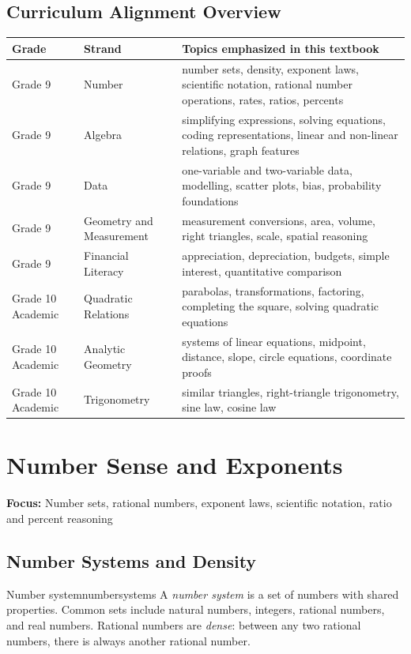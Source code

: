 \documentclass[11pt,oneside]{book}
\newcommand{\topicline}[1]{\medskip\noindent\textbf{Focus:} #1\par\medskip}
\begin{document}
\section{Curriculum Alignment Overview}
\begin{longtable}{>{\raggedright\arraybackslash}p{} >{\raggedright\arraybackslash}p{} >{\raggedright\arraybackslash}p{}}
\toprule
Grade & Strand & Topics emphasized in this textbook \\
\midrule
\endhead
Grade 9 & Number & number sets, density, exponent laws, scientific notation, rational number operations, rates, ratios, percents \\
Grade 9 & Algebra & simplifying expressions, solving equations, coding representations, linear and non-linear relations, graph features \\
Grade 9 & Data & one-variable and two-variable data, modelling, scatter plots, bias, probability foundations \\
Grade 9 & Geometry and Measurement & measurement conversions, area, volume, right triangles, scale, spatial reasoning \\
Grade 9 & Financial Literacy & appreciation, depreciation, budgets, simple interest, quantitative comparison \\
Grade 10 Academic & Quadratic Relations & parabolas, transformations, factoring, completing the square, solving quadratic equations \\
Grade 10 Academic & Analytic Geometry & systems of linear equations, midpoint, distance, slope, circle equations, coordinate proofs \\
Grade 10 Academic & Trigonometry & similar triangles, right-triangle trigonometry, sine law, cosine law \\
\bottomrule
\end{longtable}

\chapter{Number Sense and Exponents}
\topicline{Number sets, rational numbers, exponent laws, scientific notation, ratio and percent reasoning}

\section{Number Systems and Density}
\begin{definition}{Number system}{numbersystems}
A \emph{number system} is a set of numbers with shared properties. Common sets include natural numbers, integers, rational numbers, and real numbers. Rational numbers are \emph{dense}: between any two rational numbers, there is always another rational number.
\end{definition}
\end{document}
